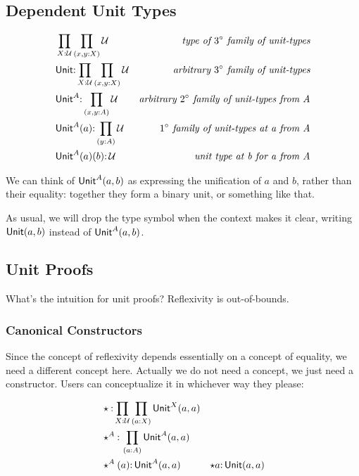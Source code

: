 \documentclass{article}
\begin{document}
\subsection{Dependent Unit Types}

\begin{align}
  & \prod\limits_{X:\mathcal{U}}\prod\limits_{(x,y:X)}\mathcal{U} & \textit{type of \(3^{\circ}\) family of unit-types} \\
  & \textsf{Unit}{:}\prod\limits_{X:\mathcal{U}}\prod\limits_{(x,y:X)}\mathcal{U} & \textit{arbitrary \(3^{\circ}\) family of unit-types} \\
  & \textsf{Unit}^A{:}\prod\limits_{(x,y:A)}\mathcal{U} & \textit{arbitrary \(2^{\circ}\) family of unit-types from A}\\
  & \textsf{Unit}^A(a){:}\prod\limits_{(y:A)}\mathcal{U} & \textit{\(1^{\circ}\) family of unit-types at a from A} \\
  & \textsf{Unit}^A(a)(b){:}\,\mathcal{U} & \textit{unit type at b for a from A} \\
\end{align}

We can think of \(\textsf{Unit}^A(a,b)\) as expressing the unification of \(a\)
and \(b\), rather than their equality: together they form a binary
unit, or something like that.

As usual, we will drop the type symbol when the context makes it
clear, writing \(\textsf{Unit}(a,b)\) instead of \(\textsf{Unit}^A(a,b)\).

\subsection{Unit Proofs}

What's the intuition for unit proofs?  Reflexivity is out-of-bounds.


\subsubsection{Canonical Constructors}

Since the concept of reflexivity depends essentially on a concept of
equality, we need a different concept here.  Actually we do not need a
concept, we just need a constructor.  Users can conceptualize it in
whichever way they please:

\begin{align}
  &\star{:}\prod\limits_{X{:}\mathcal{U}}\prod\limits_{(a:X)}\textsf{Unit}^X(a,a) \\
  &\star^A{:}\,\prod\limits_{(a:A)}\textsf{Unit}^A(a,a) \\
  &\star^A(a){:}\,\textsf{Unit}^A(a,a) & \star a{:}\,\textsf{Unit}(a,a)
\end{align}
\end{document}
